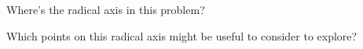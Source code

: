 Where's the radical axis in this problem?











Which points on this radical axis might be useful to consider to explore?










